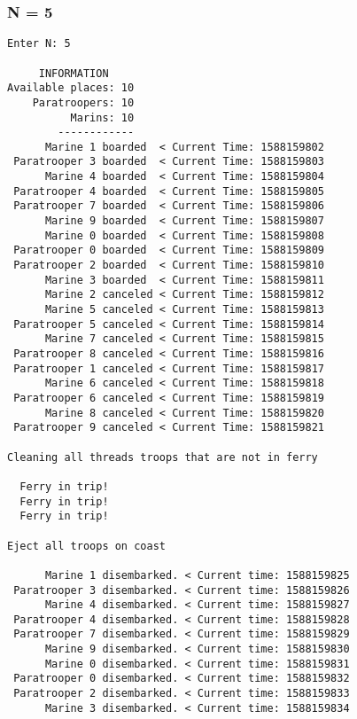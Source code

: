 \documentclass{article}
\begin{document}
\subsubsection*{N = 5}
\begin{lstlisting}[]
Enter N: 5

     INFORMATION
Available places: 10
    Paratroopers: 10
          Marins: 10
        ------------
      Marine 1 boarded  < Current Time: 1588159802 
 Paratrooper 3 boarded  < Current Time: 1588159803 
      Marine 4 boarded  < Current Time: 1588159804 
 Paratrooper 4 boarded  < Current Time: 1588159805 
 Paratrooper 7 boarded  < Current Time: 1588159806 
      Marine 9 boarded  < Current Time: 1588159807 
      Marine 0 boarded  < Current Time: 1588159808 
 Paratrooper 0 boarded  < Current Time: 1588159809 
 Paratrooper 2 boarded  < Current Time: 1588159810 
      Marine 3 boarded  < Current Time: 1588159811 
      Marine 2 canceled < Current Time: 1588159812 
      Marine 5 canceled < Current Time: 1588159813 
 Paratrooper 5 canceled < Current Time: 1588159814 
      Marine 7 canceled < Current Time: 1588159815 
 Paratrooper 8 canceled < Current Time: 1588159816 
 Paratrooper 1 canceled < Current Time: 1588159817 
      Marine 6 canceled < Current Time: 1588159818 
 Paratrooper 6 canceled < Current Time: 1588159819 
      Marine 8 canceled < Current Time: 1588159820 
 Paratrooper 9 canceled < Current Time: 1588159821 

Cleaning all threads troops that are not in ferry

  Ferry in trip!
  Ferry in trip!
  Ferry in trip!

Eject all troops on coast

      Marine 1 disembarked. < Current time: 1588159825
 Paratrooper 3 disembarked. < Current time: 1588159826
      Marine 4 disembarked. < Current time: 1588159827
 Paratrooper 4 disembarked. < Current time: 1588159828
 Paratrooper 7 disembarked. < Current time: 1588159829
      Marine 9 disembarked. < Current time: 1588159830
      Marine 0 disembarked. < Current time: 1588159831
 Paratrooper 0 disembarked. < Current time: 1588159832
 Paratrooper 2 disembarked. < Current time: 1588159833
      Marine 3 disembarked. < Current time: 1588159834
\end{lstlisting}
\newpage
\end{document}

